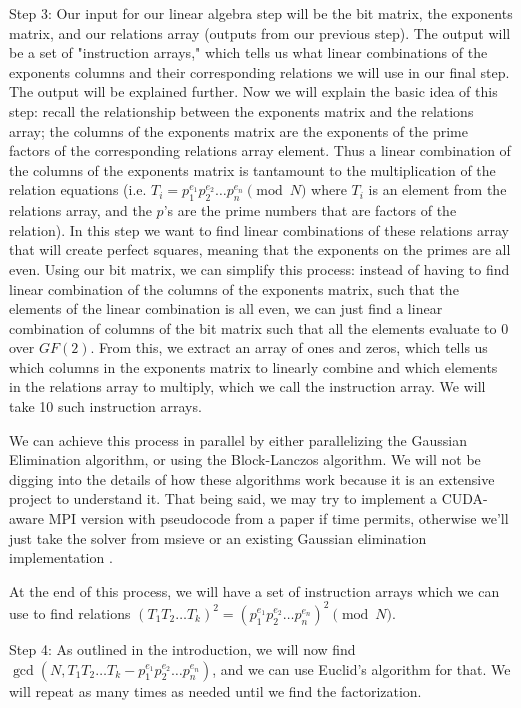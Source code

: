 \documentclass[11pt,twocolumn]{article}
\begin{document}
Step 3: Our input for our linear algebra step will be the bit matrix, the exponents matrix, and our relations array (outputs from our previous step). The output will be a set of "instruction arrays," which tells us what linear combinations of the exponents columns and their corresponding relations we will use in our final step. The output will be explained further. Now we will explain the basic idea of this step: recall the relationship between the exponents matrix and the relations array; the columns of the exponents matrix are the exponents of the prime factors of the corresponding relations array element. Thus a linear combination of the columns of the exponents matrix is tantamount to the multiplication of the relation equations (i.e. $T_i = p_1^{e_1} p_2^{e_2} \ldots p_n^{e_n} \pmod{N}$ where $T_i$ is an element from the relations array, and the $p$'s are the prime numbers that are factors of the relation). In this step we want to find linear combinations of these relations array that will create perfect squares, meaning that the exponents on the primes are all even. Using our bit matrix, we can simplify this process: instead of having to find linear combination of the columns of the exponents matrix, such that the elements of the linear combination is all even, we can just find a linear combination of columns of the bit matrix such that all the elements evaluate to $0$ over $GF(2)$. From this, we extract an array of ones and zeros, which tells us which columns in the exponents matrix to linearly combine and which elements in the relations array to multiply, which we call the instruction array. We will take 10 such instruction arrays.

We can achieve this process in parallel by either parallelizing the Gaussian Elimination algorithm, or using the Block-Lanczos algorithm. We will not be digging into the details of how these algorithms work because it is an extensive project to understand it. That being said, we may try to implement a CUDA-aware MPI version with pseudocode from a paper if time permits, otherwise we'll just take the solver from msieve \cite{papadopoulos:msieve} or an existing Gaussian elimination implementation \cite{cohen:gaussian}.

At the end of this process, we will have a set of instruction arrays which we can use to find relations $(T_1 T_2 \ldots T_k)^2 = (p_1^{e_1} p_2^{e_2} \ldots p_n^{e_n})^2 \pmod{N}$.

Step 4: As outlined in the introduction, we will now find $\gcd(N, T_1 T_2 \ldots T_k - p_1^{e_1} p_2^{e_2} \ldots p_n^{e_n})$, and we can use Euclid's algorithm for that. We will repeat as many times as needed until we find the factorization.
\end{document}
